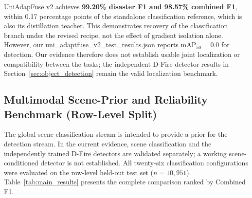 \documentclass[journal]{IEEEtran}
\begin{document}
\begin{table}[!t]
\centering
\caption[UniAdapFuse scene-classification recovery]{UniAdapFuse scene-classification recovery ($n=10{,}951$). v2 recovers classification, but its detection $\mathrm{mAP}_{50}$ is 0.0.}
\label{tab:uniadaptfuse_results}
\end{table}

UniAdapFuse v2 achieves \textbf{99.20\% disaster F1 and 98.57\% combined F1}, within 0.17 percentage points of the standalone classification reference, which is also its distillation teacher. This demonstrates recovery of the classification branch under the revised recipe, not the effect of gradient isolation alone. However, our uni\_adaptfuse\_v2\_test\_results.json reports $\mathrm{mAP}_{50}=0.0$ for detection. Our evidence therefore does not establish usable joint localization or compatibility between the tasks; the independent D-Fire detector results in Section~\ref{sec:object_detection} remain the valid localization benchmark.

\subsection{Multimodal Scene-Prior and Reliability Benchmark (Row-Level Split)}
\label{sec:classification_benchmark}

The global scene classification stream is intended to provide a prior for the detection stream. In the current evidence, scene classification and the independently trained D-Fire detectors are validated separately; a working scene-conditioned detector is not established. All twenty-six classification configurations were evaluated on the row-level held-out test set ($n=10{,}951$). Table~\ref{tab:main_results} presents the complete comparison ranked by Combined F1.
\end{document}
